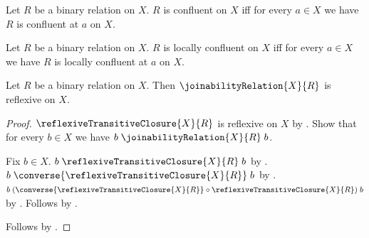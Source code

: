 \begin{definition}\label{confluent_on}
    Let $R$ be a binary relation on $X$.
    $R$ is confluent on $X$ iff
        for every $a\in X$ we have $R$ is confluent at $a$ on $X$.
\end{definition}

\begin{definition}\label{locally_confluent_on}
    Let $R$ be a binary relation on $X$.
    $R$ is locally confluent on $X$ iff
        for every $a\in X$ we have $R$ is locally confluent at $a$ on $X$.
\end{definition}

\begin{proposition}\label{joinability_relation_is_reflexive}
    Let $R$ be a binary relation on $X$.
    Then $\joinabilityRelation{X}{R}$ is reflexive on $X$.
\end{proposition}
\begin{proof}
    $\reflexiveTransitiveClosure{X}{R}$ is reflexive on $X$
        by .
    Show that for every $b\in X$ we have
        $b\mathrel{\joinabilityRelation{X}{R}}b$.
    \begin{subproof}
        Fix $b\in X$.
        $b\mathrel{\reflexiveTransitiveClosure{X}{R}}b$
            by .
        $b\mathrel{\converse{\reflexiveTransitiveClosure{X}{R}}}b$
            by .
        $b\mathrel{(\converse{\reflexiveTransitiveClosure{X}{R}}\circ
            \reflexiveTransitiveClosure{X}{R})}b$ by .
        Follows by .
    \end{subproof}
    Follows by .
\end{proof}

